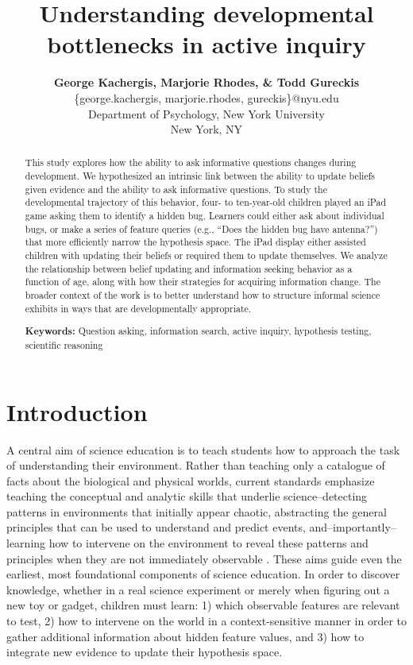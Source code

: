 \documentclass[10pt,letterpaper]{article}
\title{Understanding developmental bottlenecks in active inquiry}
\author{
  {\large \bf George Kachergis, Marjorie Rhodes, \& Todd Gureckis} \\
  \{george.kachergis, marjorie.rhodes, gureckis\}@nyu.edu \\
  Department of Psychology, New York University \\
  New York, NY
}
\begin{document}
\maketitle

\begin{abstract}This study explores how the ability to ask informative questions changes during development. We hypothesized an intrinsic link between the ability to update beliefs given evidence and the ability to ask informative questions. To study the developmental trajectory of this behavior, four- to ten-year-old children played an iPad game asking them to identify a hidden bug. Learners could either ask about individual bugs, or make a series of feature queries (e.g., ``Does the hidden bug have antenna?'') that more efficiently narrow the hypothesis space. The iPad display either assisted children with updating their beliefs or required them to update themselves. We analyze the relationship between belief updating and information seeking behavior as a function of age, along with how their strategies for acquiring information change. The broader context of the work is to better understand how to structure informal science exhibits in ways that are developmentally appropriate.

\textbf{Keywords:} 
Question asking, information search, active inquiry, hypothesis testing, scientific reasoning
\end{abstract}


\section{Introduction} 


A central aim of science education is to teach students how to approach the task of understanding their environment. Rather than teaching only a catalogue of facts about the biological and physical worlds, current standards emphasize teaching the conceptual and analytic skills that underlie science--detecting patterns in environments that initially appear chaotic, abstracting the general principles that can be used to understand and predict events, and--importantly--learning how to intervene on the environment to reveal these patterns and principles when they are not immediately observable \cite{Bransford:2000,Donovan:2005,Duschl:2007}. These aims guide even the earliest, most foundational components of science education. In order to discover knowledge, whether in a real science experiment or merely when figuring out a new toy or gadget, children must learn: 1) which observable features are relevant to test, 2) how to intervene on the world in a context-sensitive manner in order to gather additional information about hidden feature values, and 3) how to integrate new evidence to update their hypothesis space.
\end{document}

